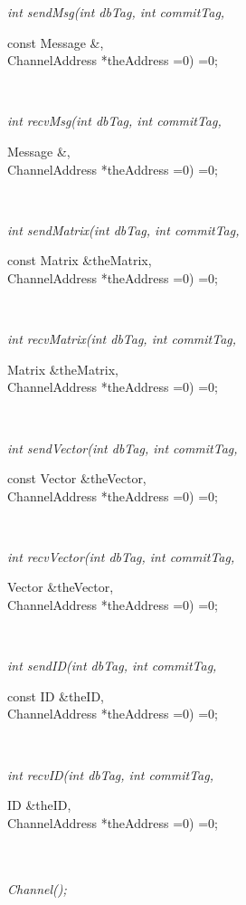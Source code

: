 {\em int sendMsg(int dbTag, int commitTag,  

\indent\indent\indent\indent\indent const Message \&, \\
\indent\indent\indent\indent\indent ChannelAddress *theAddress =0) =0;}\\
{\em int recvMsg(int dbTag, int commitTag, 

\indent\indent\indent\indent\indent Message \&, \\
\indent\indent\indent\indent\indent ChannelAddress *theAddress =0) =0;}\\
{\em int sendMatrix(int dbTag, int commitTag,  

\indent\indent\indent\indent\indent    const Matrix \&theMatrix, \\
\indent\indent\indent\indent\indent    ChannelAddress *theAddress =0) =0;}\\
{\em int recvMatrix(int dbTag, int commitTag, 

\indent\indent\indent\indent\indent    Matrix \&theMatrix,  \\
\indent\indent\indent\indent\indent    ChannelAddress *theAddress =0) =0;}\\
{\em int sendVector(int dbTag, int commitTag, 

\indent\indent\indent\indent\indent const Vector \&theVector, \\
\indent\indent\indent\indent\indent ChannelAddress *theAddress =0) =0;}\\
{\em int recvVector(int dbTag, int commitTag,  

\indent\indent\indent\indent\indent    Vector \&theVector,  \\
\indent\indent\indent\indent\indent    ChannelAddress *theAddress =0) =0;}\\
{\em int sendID(int dbTag, int commitTag, 

\indent\indent\indent\indent\indent const ID \&theID, \\
\indent\indent\indent\indent\indent ChannelAddress *theAddress =0) =0;}\\
{\em int recvID(int dbTag, int commitTag, 

\indent\indent\indent\indent\indent ID \&theID, \\
\indent\indent\indent\indent\indent ChannelAddress *theAddress =0) =0;}\\



  \\
{\em Channel();}  

